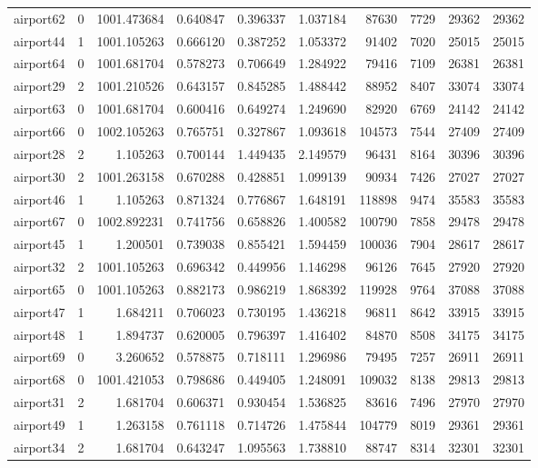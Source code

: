 \begin{longtable}{|l|r|r|r|r|r|r|r|r|r|}
airport62 & 0 & 1001.473684 & 0.640847 & 0.396337 & 1.037184 & 87630 & 7729 & 29362 & 29362 \\
airport44 & 1 & 1001.105263 & 0.666120 & 0.387252 & 1.053372 & 91402 & 7020 & 25015 & 25015 \\
airport64 & 0 & 1001.681704 & 0.578273 & 0.706649 & 1.284922 & 79416 & 7109 & 26381 & 26381 \\
airport29 & 2 & 1001.210526 & 0.643157 & 0.845285 & 1.488442 & 88952 & 8407 & 33074 & 33074 \\
airport63 & 0 & 1001.681704 & 0.600416 & 0.649274 & 1.249690 & 82920 & 6769 & 24142 & 24142 \\
airport66 & 0 & 1002.105263 & 0.765751 & 0.327867 & 1.093618 & 104573 & 7544 & 27409 & 27409 \\
airport28 & 2 & 1.105263 & 0.700144 & 1.449435 & 2.149579 & 96431 & 8164 & 30396 & 30396 \\
airport30 & 2 & 1001.263158 & 0.670288 & 0.428851 & 1.099139 & 90934 & 7426 & 27027 & 27027 \\
airport46 & 1 & 1.105263 & 0.871324 & 0.776867 & 1.648191 & 118898 & 9474 & 35583 & 35583 \\
airport67 & 0 & 1002.892231 & 0.741756 & 0.658826 & 1.400582 & 100790 & 7858 & 29478 & 29478 \\
airport45 & 1 & 1.200501 & 0.739038 & 0.855421 & 1.594459 & 100036 & 7904 & 28617 & 28617 \\
airport32 & 2 & 1001.105263 & 0.696342 & 0.449956 & 1.146298 & 96126 & 7645 & 27920 & 27920 \\
airport65 & 0 & 1001.105263 & 0.882173 & 0.986219 & 1.868392 & 119928 & 9764 & 37088 & 37088 \\
airport47 & 1 & 1.684211 & 0.706023 & 0.730195 & 1.436218 & 96811 & 8642 & 33915 & 33915 \\
airport48 & 1 & 1.894737 & 0.620005 & 0.796397 & 1.416402 & 84870 & 8508 & 34175 & 34175 \\
airport69 & 0 & 3.260652 & 0.578875 & 0.718111 & 1.296986 & 79495 & 7257 & 26911 & 26911 \\
airport68 & 0 & 1001.421053 & 0.798686 & 0.449405 & 1.248091 & 109032 & 8138 & 29813 & 29813 \\
airport31 & 2 & 1.681704 & 0.606371 & 0.930454 & 1.536825 & 83616 & 7496 & 27970 & 27970 \\
airport49 & 1 & 1.263158 & 0.761118 & 0.714726 & 1.475844 & 104779 & 8019 & 29361 & 29361 \\
airport34 & 2 & 1.681704 & 0.643247 & 1.095563 & 1.738810 & 88747 & 8314 & 32301 & 32301 \\

\end{longtable}
